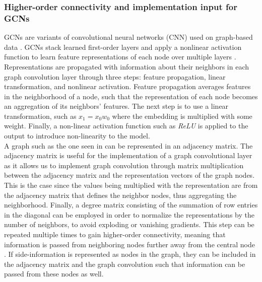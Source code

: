 \subsubsection*{Higher-order connectivity and implementation input for GCNs}
GCNs are variants of convolutional neural networks (CNN) used on graph-based data \cite{KOrderConnectivity}.
GCNs stack learned first-order layers and apply a nonlinear activation function to learn feature representations of each node over multiple layers \cite{KOrderConnectivity}.
Representations are propagated with information about their neighbors in each graph convolution layer through three steps: feature propagation, linear transformation, and nonlinear activation.
Feature propagation averages features in the neighborhood of a node, such that the representation of each node becomes an aggregation of its neighbors' features.
The next step is to use a linear transformation, such as $x_1 = x_0w_0$ where the embedding is multiplied with some weight.
Finally, a non-linear activation function such as \textit{ReLU} is applied to the output to introduce non-linearity to the model.
\\
A graph such as the one seen in  can be represented in an adjacency matrix.
The adjacency matrix is useful for the implementation of a graph convolutional layer as it allows us to implement graph convolution through matrix multiplication between the adjacency matrix and the representation vectors of the graph nodes.
This is the case since the values being multiplied with the representation are from the adjacency matrix that defines the neighbor nodes, thus aggregating the neighborhood.
Finally, a degree matrix consisting of the summation of row entries in the diagonal can be employed in order to normalize the representations by the number of neighbors, to avoid exploding or vanishing gradients.
This step can be repeated multiple times to gain higher-order connectivity, meaning that information is passed from neighboring nodes further away from the central node \cite{SimplifyingGCN, KOrderConnectivity}.
If side-information is represented as nodes in the graph, they can be included in the adjacency matrix and the graph convolution such that information can be passed from these nodes as well.
